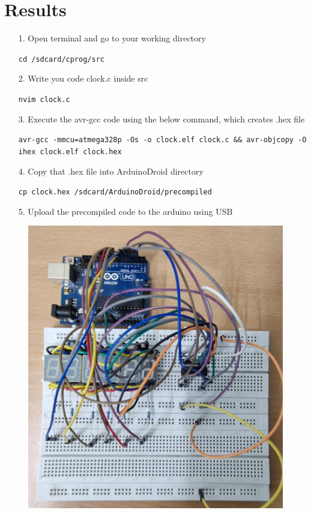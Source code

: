 \documentclass[journal]{IEEEtran}
\begin{document}
\section{Results}
\begin{itemize}
    \item[1.] Open terminal and go to your working directory 
\begin{tcolorbox}[colback=gray!15, colframe=black, sharp corners, boxrule=0.5pt, left=2mm, right=2mm, top=1mm, bottom=1mm]
\texttt{cd /sdcard/cprog/src}
\end{tcolorbox}
\item[2.] Write you code clock.c inside src 
\begin{tcolorbox}[colback=gray!15, colframe=black, sharp corners, boxrule=0.5pt, left=2mm, right=2mm, top=1mm, bottom=1mm]
\texttt{nvim clock.c}
\end{tcolorbox}
\item[3.] Execute the avr-gcc code using the below command, which creates .hex file 
\begin{tcolorbox}[colback=gray!15, colframe=black, sharp corners, boxrule=0.5pt, left=2mm, right=2mm, top=1mm, bottom=1mm]
\texttt{avr-gcc -mmcu=atmega328p -Os -o clock.elf clock.c \&\& avr-objcopy -O ihex clock.elf clock.hex}
\end{tcolorbox}
\item[4.]Copy that .hex file into ArduinoDroid directory 
\begin{tcolorbox}[colback=gray!15, colframe=black, sharp corners, boxrule=0.5pt, left=2mm, right=2mm, top=1mm, bottom=1mm]
\texttt{cp clock.hex /sdcard/ArduinoDroid/precompiled}
\end{tcolorbox}
\item[5.] Upload the precompiled code to the arduino using USB 
\end{itemize}
\begin{figure}[H]
    \centering
    \includegraphics[width=0.5\linewidth]{figs/clockbread.jpeg}
\end{figure}
\end{document}
